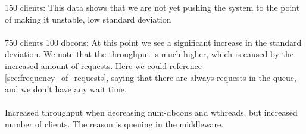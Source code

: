 \documentclass{article}
\begin{document}
\begin{table}
\begin{table}
\begin{table}
            150 clients: This data shows that we are not yet pushing the system to the point of making it unstable, low standard deviation\\
            \\
            750 clients 100 dbcons: At this point we see a significant increase in the standard deviation. We note that the throughput is much higher, which is caused by the increased amount of requests. Here we could reference \ref{sec:frequency_of_requests}, saying that there are always requests in the queue, and we don't have any wait time.\\
            \\
            Increased throughput when decreasing num-dbcons and wthreads, but increased number of clients. The reason is queuing in the middleware.


\end{table}
\end{table}
\end{table}
\end{document}
